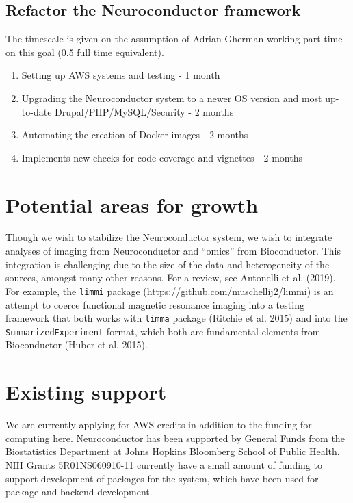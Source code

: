 \documentclass[]{elsarticle} %
\providecommand{\tightlist}{%
  \setlength{\itemsep}{0pt}\setlength{\parskip}{0pt}}
\begin{document}
\hypertarget{refactor-the-neuroconductor-framework-1}{%
\subsection{Refactor the Neuroconductor framework}\label{refactor-the-neuroconductor-framework-1}}

The timescale is given on the assumption of Adrian Gherman working part
time on this goal (0.5 full time equivalent).

\begin{enumerate}
\def\labelenumi{\arabic{enumi}.}
\tightlist
\item
  Setting up AWS systems and testing - 1 month
\item
  Upgrading the Neuroconductor system to a newer OS version and most up-to-date Drupal/PHP/MySQL/Security - 2 months
\item
  Automating the creation of Docker images - 2 months
\item
  Implements new checks for code coverage and vignettes - 2 months
\end{enumerate}

\hypertarget{potential-areas-for-growth}{%
\section{Potential areas for growth}\label{potential-areas-for-growth}}

Though we wish to stabilize the Neuroconductor system, we wish to integrate analyses of imaging from Neuroconductor and ``omics'' from Bioconductor. This integration is challenging due to the size of the data and heterogeneity of the sources, amongst many other reasons. For a review, see Antonelli et al. (2019). For example, the \texttt{limmi} package (https://github.com/muschellij2/limmi) is an attempt to coerce functional magnetic resonance imaging into a testing framework that both works with \texttt{limma} package (Ritchie et al. 2015) and into the \texttt{SummarizedExperiment} format, which both are fundamental elements from Bioconductor (Huber et al. 2015).

\hypertarget{existing-support}{%
\section{Existing support}\label{existing-support}}

We are currently applying for AWS credits in addition to the funding for computing here. Neuroconductor has been supported by General Funds from the Biostatistics Department at Johns Hopkins Bloomberg School of Public Health. NIH Grants 5R01NS060910-11 currently have a small amount of funding to support development of packages for the system, which have been used for package and backend development.
\end{document}
